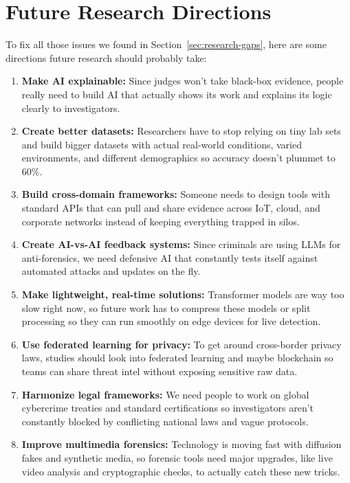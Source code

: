 \documentclass[12pt,a4paper]{article}
\begin{document}
\newpage
\section{Future Research Directions}
\label{sec:future-research-directions}

To fix all those issues we found in Section~\ref{sec:research-gaps}, here are some directions future research should probably take:

\begin{enumerate}
    \item \textbf{Make AI explainable:} Since judges won't take black-box evidence, people really need to build AI that actually shows its work and explains its logic clearly to investigators.
    \item \textbf{Create better datasets:} Researchers have to stop relying on tiny lab sets and build bigger datasets with actual real-world conditions, varied environments, and different demographics so accuracy doesn't plummet to 60\%.
    \item \textbf{Build cross-domain frameworks:} Someone needs to design tools with standard APIs that can pull and share evidence across IoT, cloud, and corporate networks instead of keeping everything trapped in silos.
    \item \textbf{Create AI-vs-AI feedback systems:} Since criminals are using LLMs for anti-forensics, we need defensive AI that constantly tests itself against automated attacks and updates on the fly.
    \item \textbf{Make lightweight, real-time solutions:} Transformer models are way too slow right now, so future work has to compress these models or split processing so they can run smoothly on edge devices for live detection.
    \item \textbf{Use federated learning for privacy:} To get around cross-border privacy laws, studies should look into federated learning and maybe blockchain so teams can share threat intel without exposing sensitive raw data.
    \item \textbf{Harmonize legal frameworks:} We need people to work on global cybercrime treaties and standard certifications so investigators aren't constantly blocked by conflicting national laws and vague protocols.
    \item \textbf{Improve multimedia forensics:} Technology is moving fast with diffusion fakes and synthetic media, so forensic tools need major upgrades, like live video analysis and cryptographic checks, to actually catch these new tricks.
\end{enumerate}
\end{document}
